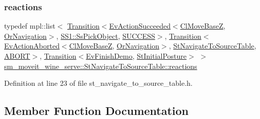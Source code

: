 \subsubsection{\texorpdfstring{reactions}{reactions}}
{\footnotesize\ttfamily typedef mpl\+::list$<$ \hyperlink{classsmacc_1_1Transition}{Transition}$<$\hyperlink{structsmacc_1_1default__events_1_1EvActionSucceeded}{Ev\+Action\+Succeeded}$<$\hyperlink{classcl__move__base__z_1_1ClMoveBaseZ}{Cl\+Move\+BaseZ}, \hyperlink{classsm__moveit__wine__serve_1_1OrNavigation}{Or\+Navigation}$>$, \hyperlink{structsm__moveit__wine__serve_1_1SS1_1_1SsPickObject}{S\+S1\+::\+Ss\+Pick\+Object}, \hyperlink{structsmacc_1_1default__transition__tags_1_1SUCCESS}{S\+U\+C\+C\+E\+SS}$>$, \hyperlink{classsmacc_1_1Transition}{Transition}$<$\hyperlink{structsmacc_1_1default__events_1_1EvActionAborted}{Ev\+Action\+Aborted}$<$\hyperlink{classcl__move__base__z_1_1ClMoveBaseZ}{Cl\+Move\+BaseZ}, \hyperlink{classsm__moveit__wine__serve_1_1OrNavigation}{Or\+Navigation}$>$, \hyperlink{structsm__moveit__wine__serve_1_1StNavigateToSourceTable}{St\+Navigate\+To\+Source\+Table}, \hyperlink{structsmacc_1_1default__transition__tags_1_1ABORT}{A\+B\+O\+RT}$>$, \hyperlink{classsmacc_1_1Transition}{Transition}$<$\hyperlink{structsm__moveit__wine__serve_1_1EvFinishDemo}{Ev\+Finish\+Demo}, \hyperlink{structsm__moveit__wine__serve_1_1StInitialPosture}{St\+Initial\+Posture}$>$ $>$ \hyperlink{structsm__moveit__wine__serve_1_1StNavigateToSourceTable_a702d1b8ac0b9b136de13a79bbe9442a0}{sm\+\_\+moveit\+\_\+wine\+\_\+serve\+::\+St\+Navigate\+To\+Source\+Table\+::reactions}}



Definition at line 23 of file st\+\_\+navigate\+\_\+to\+\_\+source\+\_\+table.\+h.



\subsection{Member Function Documentation}
\mbox{\label{structsm__moveit__wine__serve_1_1StNavigateToSourceTable_a8f1c9b49a672bd2a5c6ae0b021f5ab74}} 
